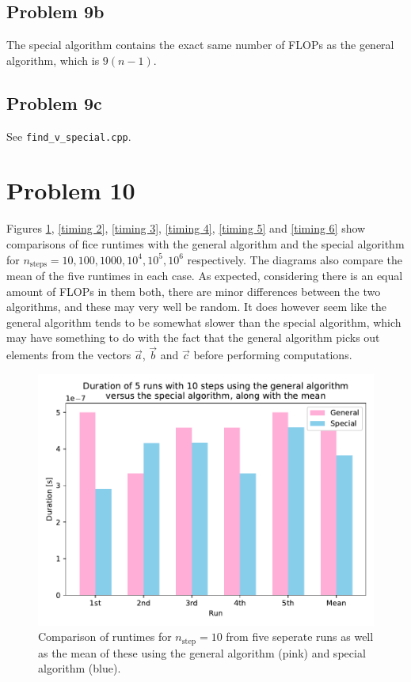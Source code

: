\documentclass[english,notitlepage]{revtex4-1}  %
\begin{document}
\subsection*{Problem 9b}
The special algorithm contains the exact same number of FLOPs as the general algorithm, which is $9(n-1)$.

\subsection*{Problem 9c}
See \verb|find_v_special.cpp|.


\section*{Problem 10}
Figures \ref{timing 1}, \ref{timing 2}, \ref{timing 3}, \ref{timing 4}, \ref{timing 5} and \ref{timing 6} show comparisons of fice runtimes with the general algorithm and the special algorithm for $n_\text{steps} = 10, 100, 1000, 10^4, 10^5, 10^6$ respectively. The diagrams also compare the mean of the five runtimes in each case. As expected, considering there is an equal amount of FLOPs in them both, there are minor differences between the two algorithms, and these may very well be random. It does however seem like the general algorithm tends to be somewhat slower than the special algorithm, which may have something to do with the fact that the general algorithm picks out elements from the vectors $\vec{a}$, $\vec{b}$ and $\vec{c}$ before performing computations.

\begin{figure}[h!]
    \vspace*{20pt}
    \centering 
    \includegraphics[scale=0.80]{../data/runtime_comparison_10.pdf} %
    \caption{Comparison of runtimes for $n_\text{step} = 10$ from five seperate runs as well as the mean of these using the general algorithm (pink) and special algorithm (blue).}
    \label{timing 1}
\end{figure}
\end{document}
